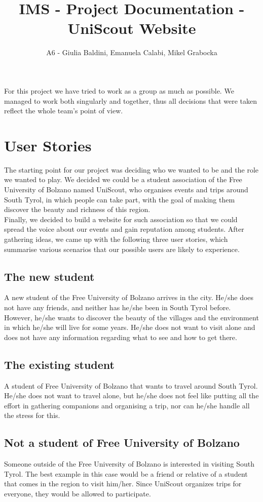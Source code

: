 \documentclass[a4paper]{article}
\title{IMS - Project Documentation - UniScout Website}
\author{A6 - Giulia Baldini, Emanuela Calabi, Mikel Grabocka}
\begin{document}
	\maketitle
	
	\noindent For this project we have tried to work as a group as much as possible. We managed to work both singularly and together, thus all decisions that were taken reflect the whole team's point of view.
	
	\section{User Stories}
	The starting point for our project was deciding who we wanted to be and the role we wanted to play. We decided we could be a student association of the Free University of Bolzano named UniScout, who organises events and trips around South Tyrol, in which people can take part, with the goal of making them discover the beauty and richness of this region.\\
	Finally, we decided to build a website for such association so that we could spread the voice about our events and gain reputation among students. After gathering ideas, we came up with the following three user stories, which summarise various scenarios that our possible users are likely to experience.
	
	\subsection{The new student}
	A new student of the Free University of Bolzano arrives in the city. He/she does not have any friends, and neither has he/she been in South Tyrol before. However, he/she wants to discover the beauty of the villages and the environment in which he/she will live for some years. He/she does not want to visit alone and does not have any information regarding what to see and how to get there.
	
	\subsection{The existing student }
	A student of Free University of Bolzano that wants to travel around South Tyrol. He/she does not want to travel alone, but he/she does not feel like putting all the effort in gathering companions and organising a trip, nor can he/she handle all the stress for this.
	
	\subsection{Not a student of Free University of Bolzano}
	Someone outside of the Free University of Bolzano is interested in visiting South Tyrol. The best example in this case would be a friend or relative of a student that comes in the region to visit him/her. Since UniScout organizes trips for everyone, they would be allowed to participate.
	
\end{document}
